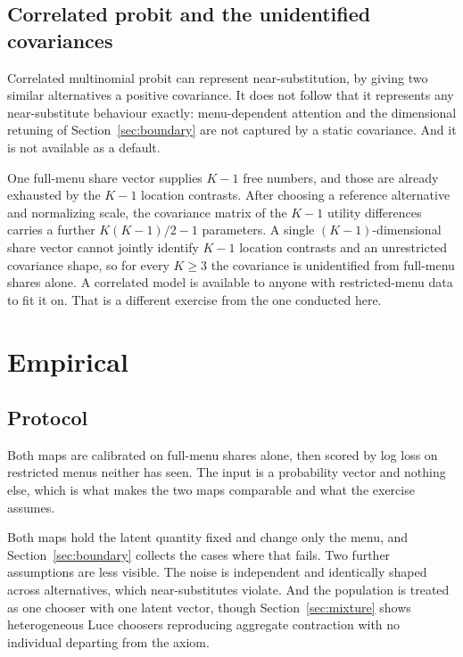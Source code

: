 \documentclass[11pt]{article}
\theoremstyle{italichead}
\begin{document}
\subsection{Correlated probit and the unidentified covariances}
\label{sec:probit}

Correlated multinomial probit can represent near-substitution, by giving two similar
alternatives a positive covariance. It does not follow that it represents any near-substitute
behaviour exactly: menu-dependent attention and the dimensional retuning of
Section~\ref{sec:boundary} are not captured by a static covariance. And it is not available as a
default.

One full-menu share vector supplies $K-1$ free numbers, and those are already exhausted by the $K-1$ location
contrasts. After choosing a reference alternative and normalizing scale, the covariance matrix
of the $K-1$ utility differences carries a further $K(K-1)/2 - 1$ parameters. A single
$(K-1)$-dimensional share vector cannot jointly identify $K-1$ location contrasts and an
unrestricted covariance shape, so for every $K \ge 3$ the covariance is unidentified from
full-menu shares alone. A correlated model is available to anyone with
restricted-menu data to fit it on. That is a different exercise from the one conducted here.

\section{Empirical}
\label{sec:empirical}

\subsection{Protocol}
\label{sec:design}

Both maps are calibrated on full-menu shares alone, then scored by log
loss on restricted menus neither has seen. The input is a probability vector and nothing else,
which is what makes the two maps comparable and what the exercise assumes.

Both maps hold the latent quantity fixed and change only the menu, and
Section~\ref{sec:boundary} collects the cases where that fails. Two further assumptions are less
visible. The noise is independent and identically shaped across alternatives, which
near-substitutes violate. And the population is treated as one chooser with one latent vector,
though Section~\ref{sec:mixture} shows heterogeneous Luce choosers reproducing aggregate
contraction with no individual departing from the axiom.
\end{document}
